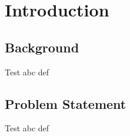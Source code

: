 
\chapter{Introduction}
\label{introduction}

\section{Background}

Test abc def

\section{Problem Statement}
\label{problem_statement}

Test abc def


